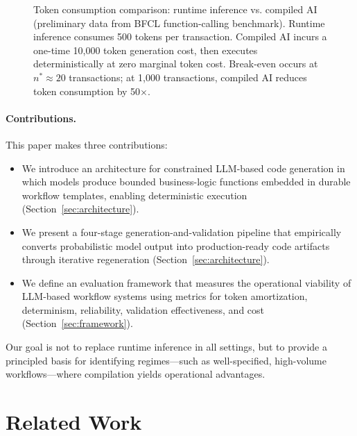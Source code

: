 \documentclass[11pt]{article}
\begin{document}
\begin{figure}[ht]
\begin{tikzpicture}[scale=0.9]
\end{tikzpicture}
\caption{Token consumption comparison: runtime inference vs. compiled AI (preliminary data from BFCL function-calling benchmark). Runtime inference consumes 500 tokens per transaction. Compiled AI incurs a one-time 10,000 token generation cost, then executes deterministically at zero marginal token cost. Break-even occurs at $n^*\approx20$ transactions; at 1,000 transactions, compiled AI reduces token consumption by 50$\times$.}
\label{fig:economics}
\end{figure}

\paragraph{Contributions.}
This paper makes three contributions:
\begin{itemize}
    \item We introduce an architecture for constrained LLM-based code generation in which models produce bounded business-logic functions embedded in durable workflow templates, enabling deterministic execution (Section~\ref{sec:architecture}).
    \item We present a four-stage generation-and-validation pipeline that empirically converts probabilistic model output into production-ready code artifacts through iterative regeneration (Section~\ref{sec:architecture}).
    \item We define an evaluation framework that measures the operational viability of LLM-based workflow systems using metrics for token amortization, determinism, reliability, validation effectiveness, and cost (Section~\ref{sec:framework}).
\end{itemize}

Our goal is not to replace runtime inference in all settings, but to provide a principled basis for identifying regimes—such as well-specified, high-volume workflows—where compilation yields operational advantages.

\section{Related Work}
\label{sec:related-work}
\end{document}
